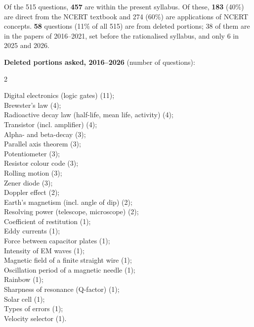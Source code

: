 {\small Of the 515 questions, \textbf{457} are within the present syllabus. Of these, \textbf{183} (40\%) are direct from the NCERT textbook and 274 (60\%) are applications of NCERT concepts. \textbf{58} questions (11\% of all 515) are from deleted portions; 38 of them are in the papers of 2016--2021, set before the rationalised syllabus, and only 6 in 2025 and 2026.}\par\medskip
{\small\textbf{\color{crimson}Deleted portions asked, 2016--2026} (number of questions):\par\smallskip
\begin{multicols}{2}\raggedright

Digital electronics (logic gates) (11);\\
Brewster's law (4);\\
Radioactive decay law (half-life, mean life, activity) (4);\\
Transistor (incl. amplifier) (4);\\
Alpha- and beta-decay (3);\\
Parallel axis theorem (3);\\
Potentiometer (3);\\
Resistor colour code (3);\\
Rolling motion (3);\\
Zener diode (3);\\
Doppler effect (2);\\
Earth's magnetism (incl. angle of dip) (2);\\
Resolving power (telescope, microscope) (2);\\
Coefficient of restitution (1);\\
Eddy currents (1);\\
Force between capacitor plates (1);\\
Intensity of EM waves (1);\\
Magnetic field of a finite straight wire (1);\\
Oscillation period of a magnetic needle (1);\\
Rainbow (1);\\
Sharpness of resonance (Q-factor) (1);\\
Solar cell (1);\\
Types of errors (1);\\
Velocity selector (1).
\end{multicols}}

